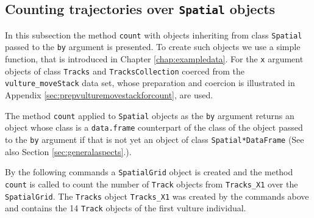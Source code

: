 \documentclass[12pt, oneside, a4paper]{scrbook}
\newcommand{\pkg}[1]{{\normalfont\fontseries{b}\selectfont #1}}
\let\code=\texttt
\newcommand{\codeintitles}[1]{{\tt #1}} %
\begin{document}
\begin{small}
\end{small}


\begin{small}
\end{small}



\subsection{Counting trajectories over \codeintitles{Spatial} objects}
\label{subsec:countoverspatial}

In this subsection the method \code{count} with objects inheriting from class \code{Spatial} passed to the \code{by} argument is presented. To create such objects we use a simple function, that is introduced in Chapter \ref{chap:exampledata}. For the \code{x} argument objects of class \code{Tracks} and \code{TracksCollection} coerced from the \code{vulture\_moveStack} data set, whose preparation and coercion is illustrated in Appendix \ref{sec:prepvulturemovestackforcount}, are used.
\par\medskip


The method \code{count} applied to \code{Spatial} objects as the \code{by} argument returns an object whose class is a \code{data.frame} counterpart of the class of the object passed to the \code{by} argument if that is not yet an object of class \code{Spatial*DataFrame} (See also Section \ref{sec:generalaspects}.).

\par\medskip

By the following commands a \code{SpatialGrid} object is created and the method \code{count} is called to count the number of \code{Track} objects from \code{Tracks\_X1} over the \code{SpatialGrid}. The \code{Tracks} object \code{Tracks\_X1} was created by the commands above and contains the 14 \code{Track} objects of the first vulture individual.
\end{document}
